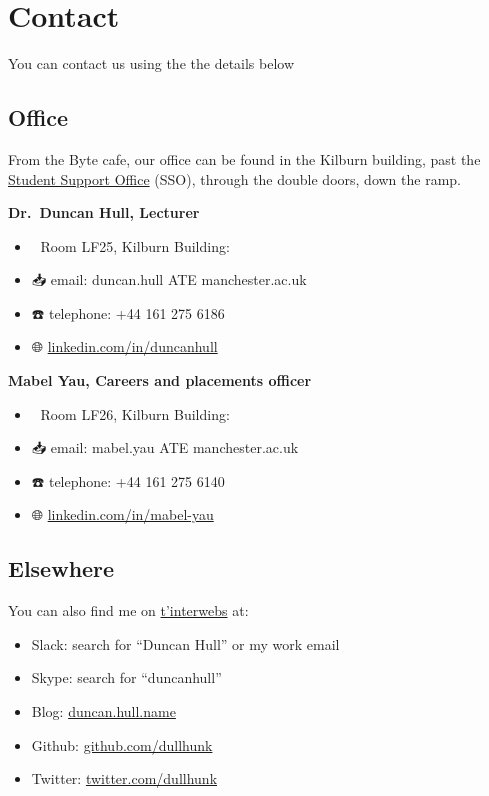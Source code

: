 \documentclass[12pt,]{book}
\providecommand{\tightlist}{%
  \setlength{\itemsep}{0pt}\setlength{\parskip}{0pt}}
\begin{document}
\hypertarget{contact}{%
\chapter{Contact}\label{contact}}

You can contact us using the the details below

\hypertarget{office}{%
\section{Office}\label{office}}

From the Byte cafe, our office can be found in the Kilburn building, past the \href{https://studentnet.cs.manchester.ac.uk/student-services/}{Student Support Office} (SSO), through the double doors, down the ramp.

\textbf{Dr.~Duncan Hull, Lecturer} 👨‍💻

\begin{itemize}
\tightlist
\item
  🏢 Room LF25, Kilburn Building:
\item
  📥 email: duncan.hull ATE manchester.ac.uk
\item
  ☎️ telephone: +44 161 275 6186
\item
  🌐 \href{https://uk.linkedin.com/in/duncanhull}{linkedin.com/in/duncanhull}
\end{itemize}

\textbf{Mabel Yau, Careers and placements officer} 👩‍💻

\begin{itemize}
\tightlist
\item
  🏢 Room LF26, Kilburn Building:
\item
  📥 email: mabel.yau ATE manchester.ac.uk
\item
  ☎️ telephone: +44 161 275 6140
\item
  🌐 \href{https://uk.linkedin.com/in/mabel-yau}{linkedin.com/in/mabel-yau}
\end{itemize}

\hypertarget{elsewhere}{%
\section{Elsewhere}\label{elsewhere}}

You can also find me on \href{https://www.google.com/search?q=interweb}{t'interwebs} at:

\begin{itemize}
\tightlist
\item
  Slack: search for ``Duncan Hull'' or my work email
\item
  Skype: search for ``duncanhull''
\item
  Blog: \href{https://duncan.hull.name}{duncan.hull.name}
\item
  Github: \href{https://github.com/dullhunk}{github.com/dullhunk}
\item
  Twitter: \href{https://twitter.com/dullhunk}{twitter.com/dullhunk}
\end{itemize}
\end{document}
